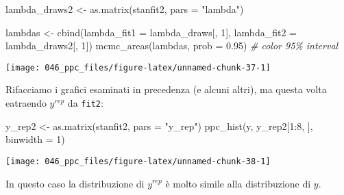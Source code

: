 \documentclass[
]{memoir}
\newenvironment{Shaded}{\begin{snugshade}}{\end{snugshade}}
\newcommand{\AttributeTok}[1]{\textcolor[rgb]{0.77,0.63,0.00}{#1}}
\newcommand{\CommentTok}[1]{\textcolor[rgb]{0.56,0.35,0.01}{\textit{#1}}}
\newcommand{\DecValTok}[1]{\textcolor[rgb]{0.00,0.00,0.81}{#1}}
\newcommand{\FloatTok}[1]{\textcolor[rgb]{0.00,0.00,0.81}{#1}}
\newcommand{\FunctionTok}[1]{\textcolor[rgb]{0.00,0.00,0.00}{#1}}
\newcommand{\NormalTok}[1]{#1}
\newcommand{\OtherTok}[1]{\textcolor[rgb]{0.56,0.35,0.01}{#1}}
\newcommand{\SpecialCharTok}[1]{\textcolor[rgb]{0.00,0.00,0.00}{#1}}
\newcommand{\StringTok}[1]{\textcolor[rgb]{0.31,0.60,0.02}{#1}}
\theoremstyle{definition}
\theoremstyle{definition}
\theoremstyle{definition}
\theoremstyle{definition}
\theoremstyle{remark}
\begin{document}
\begin{Shaded}
\end{Shaded}

\begin{Shaded}
\begin{Highlighting}[]
\NormalTok{lambda\_draws2 }\OtherTok{\textless{}{-}} \FunctionTok{as.matrix}\NormalTok{(stanfit2, }\AttributeTok{pars =} \StringTok{"lambda"}\NormalTok{)}

\NormalTok{lambdas }\OtherTok{\textless{}{-}} \FunctionTok{cbind}\NormalTok{(}\AttributeTok{lambda\_fit1 =}\NormalTok{ lambda\_draws[, }\DecValTok{1}\NormalTok{],}
                 \AttributeTok{lambda\_fit2 =}\NormalTok{ lambda\_draws2[, }\DecValTok{1}\NormalTok{])}
\FunctionTok{mcmc\_areas}\NormalTok{(lambdas, }\AttributeTok{prob =} \FloatTok{0.95}\NormalTok{) }\CommentTok{\# color 95\% interval}
\end{Highlighting}
\end{Shaded}

\begin{center}\texttt{[image: 046\_ppc\_files/figure-latex/unnamed-chunk-37-1]} \end{center}

Rifacciamo i grafici esaminati in precedenza (e alcuni altri), ma questa volta eatraendo \(y^{rep}\) da \texttt{fit2}:

\begin{Shaded}
\begin{Highlighting}[]
\NormalTok{y\_rep2 }\OtherTok{\textless{}{-}} \FunctionTok{as.matrix}\NormalTok{(stanfit2, }\AttributeTok{pars =} \StringTok{"y\_rep"}\NormalTok{)}
\FunctionTok{ppc\_hist}\NormalTok{(y, y\_rep2[}\DecValTok{1}\SpecialCharTok{:}\DecValTok{8}\NormalTok{, ], }\AttributeTok{binwidth =} \DecValTok{1}\NormalTok{)}
\end{Highlighting}
\end{Shaded}

\begin{center}\texttt{[image: 046\_ppc\_files/figure-latex/unnamed-chunk-38-1]} \end{center}

\noindent
In questo caso la distribuzione di \(y^{rep}\) è molto simile alla distribuzione di \(y\).
\end{document}
